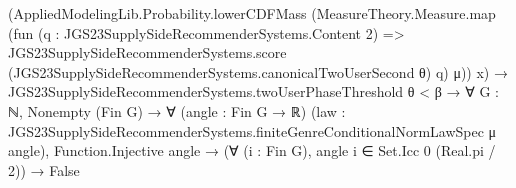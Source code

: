 \documentclass[10pt]{article}
\begin{document}
\begin{ReviewVerbatim}
                      (AppliedModelingLib.Probability.lowerCDFMass
                        (MeasureTheory.Measure.map
                          (fun (q : JGS23SupplySideRecommenderSystems.Content 2) =>
                            JGS23SupplySideRecommenderSystems.score
                              (JGS23SupplySideRecommenderSystems.canonicalTwoUserSecond θ) q)
                          μ))
                      x) →
                  JGS23SupplySideRecommenderSystems.twoUserPhaseThreshold θ < β →
                    ∀ {G : ℕ},
                      Nonempty (Fin G) →
                        ∀ (angle : Fin G → ℝ)
                          (law : JGS23SupplySideRecommenderSystems.finiteGenreConditionalNormLawSpec μ angle),
                          Function.Injective angle → (∀ (i : Fin G), angle i ∈ Set.Icc 0 (Real.pi / 2)) → False
\end{ReviewVerbatim}
\end{document}
